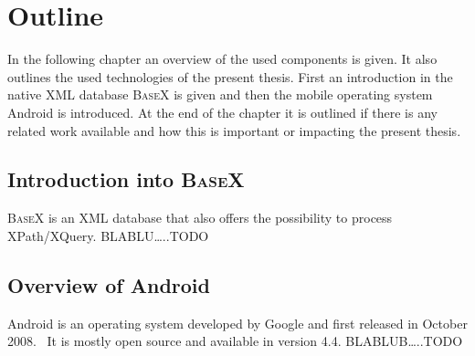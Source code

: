 \chapter{Outline}
\label{cha:overview}
In the following chapter an overview of the used components is given.
It also outlines the used technologies of the present thesis.
First an introduction in the native XML database \textsc{BaseX} is given and then the mobile operating system Android is introduced.
At the end of the chapter it is outlined if there is any related work available and how this is important or impacting the present thesis.


%

\section{Introduction into \textsc{BaseX}}
\label{sec:overview:introduction-into-basex}
\textsc{BaseX} is an XML database that also offers the possibility to process XPath/XQuery.
BLABLU\dots..TODO

\section{Overview of Android}
\label{sec:overview:overview-of-android}
Android is an operating system developed by Google and first released in October 2008.~\cite{developers2011android}
It is mostly open source and available in version 4.4.
BLABLUB\dots..TODO
